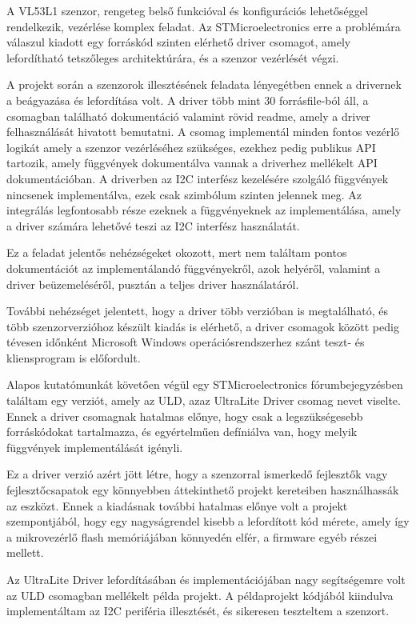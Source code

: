 \medskip

A VL53L1 szenzor, rengeteg belső funkcióval és konfigurációs lehetőséggel
rendelkezik, vezérlése komplex feladat. Az STMicroelectronics erre a problémára
válaszul kiadott egy forráskód szinten elérhető driver csomagot, amely
lefordítható tetszőleges architektúrára, és a szenzor vezérlését végzi.

A projekt során a szenzorok illesztésének feladata lényegétben ennek a drivernek
a beágyazása és lefordítása volt.  A driver több mint 30 forrásfile-ból áll, a
csomagban található dokumentáció valamint rövid readme, amely a driver
felhasználását hivatott bemutatni. A csomag implementál minden fontos vezérlő
logikát amely a szenzor vezérléséhez szükséges, ezekhez pedig publikus API
tartozik, amely függvények dokumentálva vannak a driverhez mellékelt API
dokumentációban. A driverben az I2C interfész kezelésére szolgáló függvények
nincsenek implementálva, ezek csak szimbólum szinten jelennek meg. Az integrálás
legfontosabb része ezeknek a függvényeknek az implementálása, amely a driver
számára lehetővé teszi az I2C interfész használatát.

Ez a feladat jelentős nehézségeket okozott, mert nem találtam pontos
dokumentációt az implementálandó függvényekről, azok helyéről, valamint a driver
beüzemeléséről, pusztán a teljes driver használatáról.

További nehézséget jelentett, hogy a driver több verzióban is megtalálható, és
több szenzorverzióhoz készült kiadás is elérhető, a driver csomagok között pedig
tévesen időnként Microsoft Windows operációsrendszerhez szánt teszt- és
kliensprogram is előfordult.

\medskip

Alapos kutatómunkát követően végül egy STMicroelectronics fórumbejegyzésben
találtam egy verziót, amely az ULD, azaz UltraLite Driver csomag nevet
viselte. Ennek a driver csomagnak hatalmas előnye, hogy csak a legszükségesebb
forráskódokat tartalmazza, és egyértelműen defíniálva van, hogy melyik függvények
implementálását igényli.

Ez a driver verzió azért jött létre, hogy a szenzorral ismerkedő fejlesztők vagy
fejlesztőcsapatok egy könnyebben áttekinthető projekt kereteiben használhassák az
eszközt. Ennek a kiadásnak további hatalmas előnye volt a projekt szempontjából,
hogy egy nagyságrendel kisebb a lefordított kód mérete, amely így a mikrovezérlő
flash memóriájában könnyedén elfér, a firmware egyéb részei mellett.

Az UltraLite Driver lefordításában és implementációjában nagy segítségemre volt
az ULD csomagban mellékelt példa projekt. A példaprojekt kódjából kiindulva
implementáltam az I2C periféria illesztését, és sikeresen teszteltem a szenzort.

